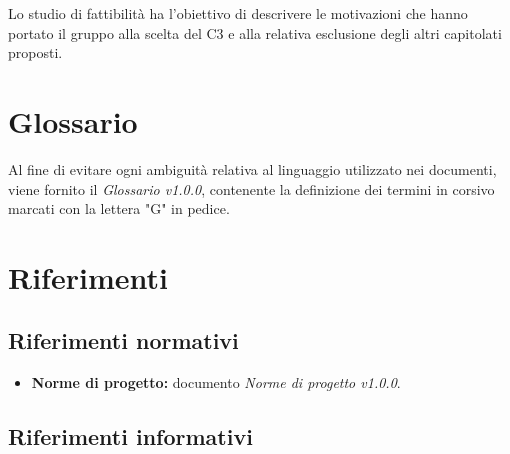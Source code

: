 \documentclass[openany,12pt,a4paper]{report}
\begin{document}
	Lo studio di fattibilità ha l’obiettivo di descrivere le motivazioni che hanno portato
	il gruppo alla scelta del  C3 e alla relativa esclusione degli altri capitolati proposti.

	\section{Glossario}

	Al fine di evitare ogni ambiguità relativa al linguaggio utilizzato nei documenti, viene fornito il \textit{Glossario v1.0.0}, contenente la definizione dei termini in corsivo marcati con la lettera "G" in pedice.

	\section{Riferimenti}

	\subsection{Riferimenti normativi}

	\begin{itemize}

		\item \textbf{Norme di progetto:} documento \textit{Norme di progetto v1.0.0}.

	\end{itemize}

	\subsection{Riferimenti informativi}
\end{document}
